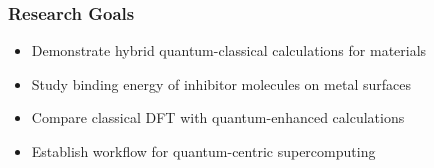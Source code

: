 \begin{frame}
\frametitle{Research Goals}
\begin{itemize}
    \item Demonstrate hybrid quantum-classical calculations for materials
    \item Study binding energy of inhibitor molecules on metal surfaces
    \item Compare classical DFT with quantum-enhanced calculations
    \item Establish workflow for quantum-centric supercomputing
\end{itemize}
\end{frame} 
